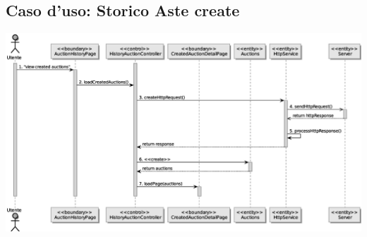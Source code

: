 \subsection{Caso d'uso: Storico Aste create}
\includegraphics[width=\textwidth]{assets/sequence/visualizzazione_storico_aste_ancora_attive.eps}
